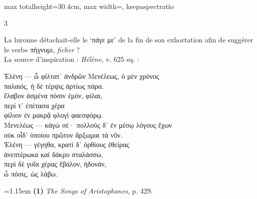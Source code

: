 \documentclass[11pt,twoside]{book}
\newcommand{\currHeadLE}{}
\newcommand{\currHeadRE}{}
\newcommand{\currHeadLO}{}
\newcommand{\currHeadRO}{}
\newcommand{\italique}[1]{\textit{#1}}
\newcommand{\citComm}[1]{\begin{quoting}[vskip=0.4pt,leftmargin=0.7em,rightmargin=0.2em]#1\end{quoting}}
\newcommand{\R}{\textbf{R}}
\begin{document}
\begin{adjustbox}{max totalheight=30.4cm, max width=\textwidth, keepaspectratio}
\begin{minipage}{\textwidth}
{\begin{multicols}{3}
\par\vspace{1.5pt}
\noindent La luronne détachait-elle le `πάγε με' de la fin de son exhortation afin de suggérer le verbe πήγνυμι, \italique{ficher} ?\\ La source d'inspiration : \italique{Hélène}, v. 625 sq. :
\citComm{Ἑλένη --- ὦ φίλτατ᾽ ἀνδρῶν Μενέλεως, ὁ μὲν χρόνος\\
παλαιός, ἡ δὲ τέρψις ἀρτίως πάρα.\\
ἔλαβον ἀσμένα πόσιν ἐμόν, φίλαι,\\
περί τ᾽ ἐπέτασα χέρα\\
φίλιον ἐν μακρᾷ φλογὶ φαεσφόρῳ.\\
Μενελέως --- κἀγὼ σέ· πολλοὺς δ᾽ ἐν μέσῳ λόγους ἔχων\\
οὐκ οἶδ᾽ ὁποίου πρῶτον ἄρξωμαι τὰ νῦν.\\
Ἑλένη --- γέγηθα, κρατὶ δ᾽ ὀρθίους ἐθείρας\\
ἀνεπτέρωκα καὶ δάκρυ σταλάσσω,\\
περὶ δὲ γυῖα χέρας ἔβαλον, ἡδονάν,\\
ὦ πόσις, ὡς λάβω.}
\par\vspace{1.5pt}
\par\vspace{1.2pt}\par\nopagebreak\vspace{1pt}\noindent\hangindent=1.15em {\color{sepiaNote}\textbf{(1)}} \italique{The Songs of Aristophanes}, p. 429.
\par\end{multicols}}
\end{minipage}\end{adjustbox}
\clearpage\ifodd\value{page}\hbox{}\newpage\fi
\renewcommand{\currHeadLE}{ΑΡΙΣΤΟΦΑΝΟΥΣ ΘΕΣΜΟΦΟΡΙΑΖΟΥΣΑΙ · CODEX RAVENNAS 429 (\R)}
\renewcommand{\currHeadRE}{Folio f. 173v (Classense 175v) · vv. 920–958}
\renewcommand{\currHeadLO}{FAC-SIMILÉ DU CODEX RAVENNAS 429 (\R) · f. 173v (Classense 175v)}
\renewcommand{\currHeadRO}{vv. 920–958 · Planche recadrée sur la zone écrite et harmonisée}
\end{document}
